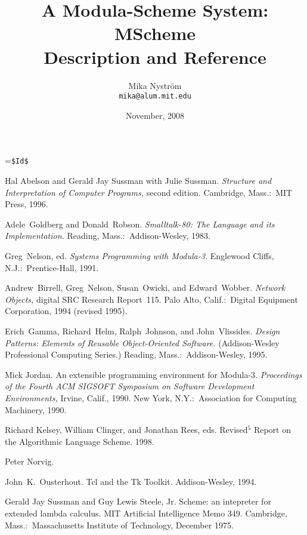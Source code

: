 \documentclass[12pt]{report}
\title{\bfseries\sffamily\fontsize{24.88}{30}\selectfont A Modula-Scheme System: \\ MScheme \\ Description and Reference}
\author{Mika Nystr\"om \\ {\tt mika@alum.mit.edu}}
\date{November, 2008}
\begin{document}
\def\ns{}
\ifx\DIST\undefined
{}=\vbox{\verb+$Id$+}
\fi

\thispagestyle{empty}

\maketitle

\thispagestyle{empty}

\newpage
\tableofcontents
\newpage







\newpage
{
\frenchspacing
\begin{thebibliography}{99}

 Hal Abelson and Gerald Jay Sussman with Julie Sussman.  {\it Structure and Interpretation of Computer Programs,} second edition.  Cambridge, Mass.:\ MIT Press, 1996.

 Adele~Goldberg and Donald~Robson.  {\it Smalltalk-80: The Language and its Implementation.}  Reading, Mass.:\ Addison-Wesley, 1983.

  Greg~Nelson, ed.  {\it Systems Programming with Modula-3.}  Englewood Cliffs, N.J.:\ Prentice-Hall, 1991.

 Andrew~Birrell, Greg~Nelson, Susan~Owicki, and Edward~Wobber.  {\it Network Objects,} digital SRC Research Report~115.  Palo Alto, Calif.:\ Digital Equipment Corporation, 1994 (revised 1995).

 Erich~Gamma, Richard~Helm, Ralph~Johnson, and John~Vlissides.  {\it Design Patterns: Elements of Reusable Object-Oriented Software.}  (Addison-Wesley Professional Computing Series.)  Reading, Mass.:\ Addison-Wesley, 1995.

  Mick Jordan.  An extensible programming environment for Modula-3.  {\it Proceedings of the Fourth ACM SIGSOFT Symposium on Software Development Environments,} Irvine, Calif., 1990.  New York, N.Y.:\ Association for Computing Machinery, 1990.


 Richard Kelsey, William Clinger, and Jonathan Rees, eds.
Revised$^5$ Report on the Algorithmic Language Scheme.  1998.

 Peter Norvig.

 John~K.~Ousterhout.  Tcl and the Tk Toolkit.  Addison-Wesley, 1994.

 Gerald Jay Sussman and Guy Lewis Steele, Jr.  Scheme: an intepreter for extended lambda calculus.  MIT Artificial Intelligence Memo 349.  Cambridge, Mass.:\ Massachusetts Institute of Technology, December 1975.
\end{thebibliography}
}
\end{document}
